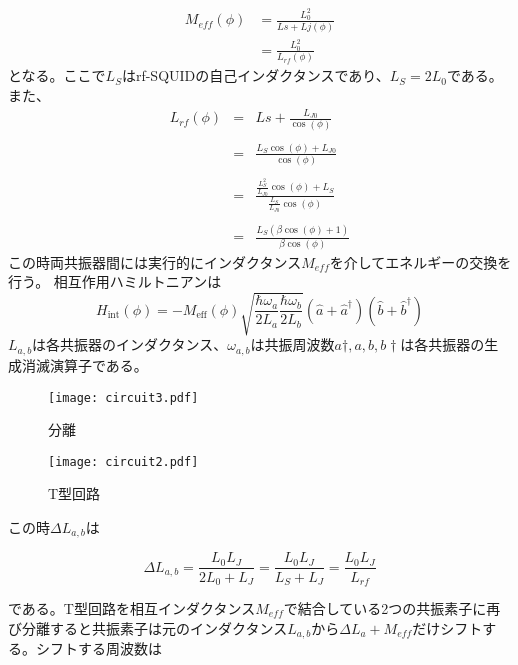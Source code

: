 \begin{eqnarray}
    M_{eff}(\phi) & = \frac{L_0^2}{Ls+Lj(\phi)}\\
    & =\frac{L_0^2}{L_{rf}(\phi)}
\end{eqnarray}
となる。ここで$L_S$はrf-SQUIDの自己インダクタンスであり、$L_S = 2 L_0$である。
また、
\begin{eqnarray}
    L_{rf}(\phi)  &=& Ls+\frac{L_{J0}}{\cos (\phi)}\\ \\
    &=& \frac{L_S \cos (\phi)+L_{J0}}{\cos (\phi)}\\ \\
    &=& \frac{\frac{L_S^2}{L_{J0}} \cos (\phi)+L_S}{\frac{L_S}{L_{J0}}\cos (\phi)}\\ \\
    &=& \frac{L_S(\beta \cos (\phi)+1)}{\beta \cos (\phi)}
\end{eqnarray}
この時両共振器間には実行的にインダクタンス$M_{eff}$を介してエネルギーの交換を行う。
相互作用ハミルトニアンは
\begin{equation}
    H_{\mathrm{int}}(\phi)=-M_{\mathrm{eff}}(\phi) \sqrt{\frac{\hbar \omega_{a}}{2 L_{a}} \frac{\hbar \omega_{b}}{2 L_{b}}}\left(\hat{a}+\hat{a}^{\dagger}\right)\left(\hat{b}+\hat{b}^{\dagger}\right)
\end{equation}
$L_{a,b}$は各共振器のインダクタンス、$\omega_{a,b}$は共振周波数$a\dagger,a,b,b\dagger$は各共振器の生成消滅演算子である。

\begin{figure}[H]
    \begin{minipage}[t]{0.5\columnwidth}
        \centering
        \texttt{[image: circuit3.pdf]}
        \caption{分離}
    \end{minipage}%
    \begin{minipage}[t]{0.5\columnwidth}
        \centering
        \texttt{[image: circuit2.pdf]}
        \caption{T型回路}
    \end{minipage}
\end{figure}
この時$\Delta L_{a,b}$は

\begin{equation}
    \Delta L_{a,b} = \frac{L_0L_J}{2L_0+L_J} = \frac{L_0L_J}{L_S+L_J} = \frac{L_0L_J}{L_{rf}}
\end{equation}

である。T型回路を相互インダクタンス$M_{eff}$で結合している2つの共振素子に再び分離すると共振素子は元のインダクタンス$L_{a,b}$から$\Delta L_a + M_{eff}$だけシフトする。シフトする周波数は


